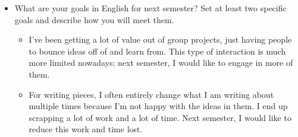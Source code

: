\documentclass[letterpaper]{article}
\begin{document}
\begin{itemize}
\item What are your goals in English for next semester? Set at least two
specific goals and describe how you will meet them.

\begin{itemize}
\item I've been getting a lot of value out of group projects, just having
people to bounce ideas off of and learn from. This type of
interaction is much more limited nowadays; next semester, I would
like to engage in more of them.
\item For writing pieces, I often entirely change what I am writing about
multiple times because I'm not happy with the ideas in them. I end
up scrapping a lot of work and a lot of time. Next semester, I would
like to reduce this work and time lost.
\end{itemize}
\end{itemize}
\end{document}
